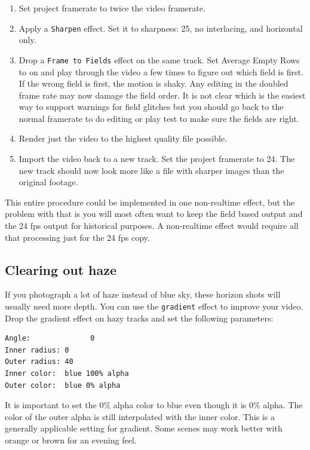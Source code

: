 \begin{enumerate}
	\item Set project framerate to twice the video framerate.
	\item Apply a \texttt{Sharpen} effect. Set it to sharpness: 25, no interlacing, and horizontal only.
	\item Drop a \texttt{Frame to Fields} effect on the same track. Set Average Empty Rows to on and play through 
	the video a few times to figure out which field is first. If the wrong field is first, the motion is shaky.
	Any editing in the doubled frame rate may now damage the field order. It is not clear which is the
	easiest way to support warnings for field glitches but you should go back to the normal framerate to
	do editing or play test to make sure the fields are right.
	\item Render just the video to the highest quality file possible.
	\item Import the video back to a new track. Set the project framerate to 24. The new track should now
	look more like a file with sharper images than the original footage.
\end{enumerate}

This entire procedure could be implemented in one non-realtime effect, but the problem with that is you will most often want to keep the field based output and the 24 fps output for historical purposes. A non-realtime effect would require all that processing just for the 24 fps copy.

\subsection{Clearing out haze}%
\label{sub:clearing_out_haze}

If you photograph a lot of haze instead of blue sky, these horizon shots will usually need more depth. You can use the \texttt{gradient} effect to improve your video. Drop the gradient effect on hazy tracks and set the following parameters:

\begin{lstlisting}[language=bash,numbers=none]
Angle: 				0
Inner radius: 0
Outer radius: 40
Inner color:  blue 100% alpha 
Outer color:  blue 0% alpha
\end{lstlisting}

It is important to set the $0\%$ alpha color to blue even though it is $0\%$ alpha. The color of the outer alpha is still interpolated with the inner color. This is a generally applicable setting for gradient. Some scenes may work better with orange or brown for an evening feel.

